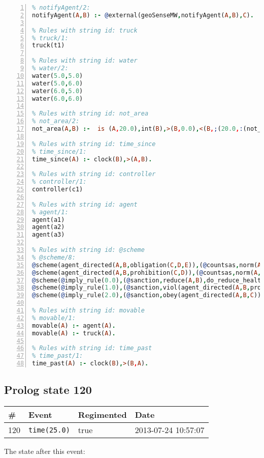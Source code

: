\documentclass[11pt]{article}\usepackage[utf8]{inputenc}\usepackage{geometry}
\begin{document}
\begin{lstlisting}[language=Prolog, numbers=left]
% Rules with string id: notifyAgent
% notifyAgent/2:
notifyAgent(A,B) :- @external(geoSenseMW,notifyAgent(A,B),C).

% Rules with string id: truck
% truck/1:
truck(t1)

% Rules with string id: water
% water/2:
water(5.0,5.0)
water(5.0,6.0)
water(6.0,5.0)
water(6.0,6.0)

% Rules with string id: not_area
% not_area/2:
not_area(A,B) :-  is (A,20.0),int(B),>(B,0.0),<(B,;(20.0,:(not_area(A,B), is (-(B),20.0)))),int(A),>(A,0.0),<(A,;(20.0,:(area(A,B),-(int(A))))),int(B),>(A,0.0),>(B,0.0),<(A,21.0),<(B,21.0).

% Rules with string id: time_since
% time_since/1:
time_since(A) :- clock(B),>(A,B).

% Rules with string id: controller
% controller/1:
controller(c1)

% Rules with string id: agent
% agent/1:
agent(a1)
agent(a2)
agent(a3)

% Rules with string id: @scheme
% @scheme/8:
@scheme(agent_directed(A,B,obligation(C,D,E)),(@countsas,norm(A,B,F,obligation(C,D,E)),F),false,(listTrue(C)),(time_past(D)),false,[plus(viol(agent_directed(A,B,obligation(C,D,E))))|[]],[plus(obey(agent_directed(A,B,obligation(C,D,E))))|[]])
@scheme(agent_directed(A,B,prohibition(C,D)),(@countsas,norm(A,B,E,prohibition(C,D)),E),(listTrue(C)),false,(false),false,[plus(viol(agent_directed(A,B,prohibition(C,D))))|[]],[plus(obey(agent_directed(A,B,prohibition(C,D))))|[]])
@scheme(@imply_rule(0.0),(@sanction,reduce(A,B),do_reduce_health(A,B),notifyAgent(A,changed(status))),true,false,false,false,[min(reduce(A,B))|[]],[])
@scheme(@imply_rule(1.0),(@sanction,viol(agent_directed(A,B,prohibition(C,D))),do_sanction(D)),true,false,false,false,[min(viol(agent_directed(A,B,prohibition(C,D))))|[]],[])
@scheme(@imply_rule(2.0),(@sanction,obey(agent_directed(A,B,C))),true,false,false,false,[min(obey(agent_directed(A,B,C)))|[]],[])

% Rules with string id: movable
% movable/1:
movable(A) :- agent(A).
movable(A) :- truck(A).

% Rules with string id: time_past
% time_past/1:
time_past(A) :- clock(B),>(B,A).

\end{lstlisting}
\clearpage 
\subsection{Prolog state 120}
\begin{table}[ht]
\centering 
\begin{tabular}{l l l l} 
\textbf{\#} & \textbf{Event} & \textbf{Regimented} & \textbf{Date} \\ [0.5ex] 
\hline
120&\texttt{time(25.0)}&true&2013-07-24 10:57:07\\ [1ex] \hline\end{tabular}
\end{table}
The state after this event:
\end{document}
